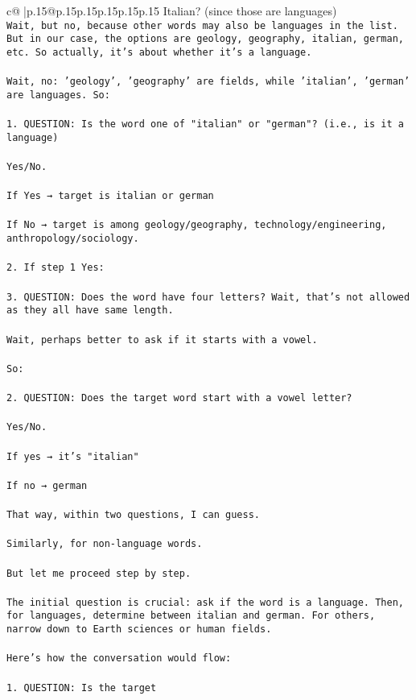 \documentclass{article}
\begin{document}
{\begin{supertabular}{c@{$\;$}|p{.15\linewidth}@{}p{.15\linewidth}p{.15\linewidth}p{.15\linewidth}p{.15\linewidth}p{.15\linewidth}}
{{{Italian? (since those are languages)\\ \tt    Wait, but no, because other words may also be languages in the list. But in our case, the options are geology, geography, italian, german, etc. So actually, it's about whether it's a language.\\ \tt \\ \tt Wait, no: 'geology', 'geography' are fields, while 'italian', 'german' are languages. So:\\ \tt \\ \tt 1. QUESTION: Is the word one of "italian" or "german"? (i.e., is it a language)\\ \tt \\ \tt Yes/No.\\ \tt \\ \tt If Yes → target is italian or german\\ \tt \\ \tt If No → target is among geology/geography, technology/engineering, anthropology/sociology.\\ \tt \\ \tt 2. If step 1 Yes:\\ \tt \\ \tt 3. QUESTION: Does the word have four letters? Wait, that's not allowed as they all have same length.\\ \tt \\ \tt Wait, perhaps better to ask if it starts with a vowel.\\ \tt \\ \tt So:\\ \tt \\ \tt 2. QUESTION: Does the target word start with a vowel letter?\\ \tt \\ \tt Yes/No.\\ \tt \\ \tt If yes → it's "italian"\\ \tt \\ \tt If no → german\\ \tt \\ \tt That way, within two questions, I can guess.\\ \tt \\ \tt Similarly, for non-language words.\\ \tt \\ \tt But let me proceed step by step.\\ \tt \\ \tt The initial question is crucial: ask if the word is a language. Then, for languages, determine between italian and german. For others, narrow down to Earth sciences or human fields.\\ \tt \\ \tt Here's how the conversation would flow:\\ \tt \\ \tt 1. QUESTION: Is the target }}}
\end{supertabular}}
\end{document}
